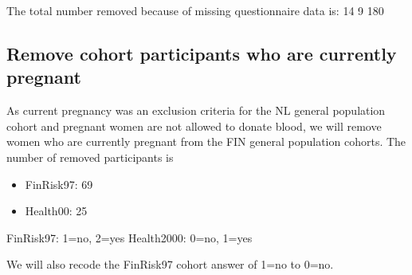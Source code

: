 \documentclass[
]{article}
\newenvironment{Shaded}{\begin{snugshade}}{\end{snugshade}}
\newcommand{\CommentTok}[1]{\textcolor[rgb]{0.56,0.35,0.01}{\textit{#1}}}
\newcommand{\DecValTok}[1]{\textcolor[rgb]{0.00,0.00,0.81}{#1}}
\newcommand{\FunctionTok}[1]{\textcolor[rgb]{0.00,0.00,0.00}{#1}}
\newcommand{\NormalTok}[1]{#1}
\newcommand{\OtherTok}[1]{\textcolor[rgb]{0.56,0.35,0.01}{#1}}
\newcommand{\SpecialCharTok}[1]{\textcolor[rgb]{0.00,0.00,0.00}{#1}}
\newcommand{\StringTok}[1]{\textcolor[rgb]{0.31,0.60,0.02}{#1}}
\providecommand{\tightlist}{%
  \setlength{\itemsep}{0pt}\setlength{\parskip}{0pt}}
\begin{document}
The total number removed because of missing questionnaire data is: 14 9
180

\hypertarget{remove-cohort-participants-who-are-currently-pregnant}{%
\subsection{Remove cohort participants who are currently
pregnant}\label{remove-cohort-participants-who-are-currently-pregnant}}

As current pregnancy was an exclusion criteria for the NL general
population cohort and pregnant women are not allowed to donate blood, we
will remove women who are currently pregnant from the FIN general
population cohorts. The number of removed participants is

\begin{itemize}
\tightlist
\item
  FinRisk97: 69
\item
  Health00: 25
\end{itemize}

FinRisk97: 1=no, 2=yes Health2000: 0=no, 1=yes

We will also recode the FinRisk97 cohort answer of 1=no to 0=no.

\begin{Shaded}
\end{Shaded}
\end{document}
